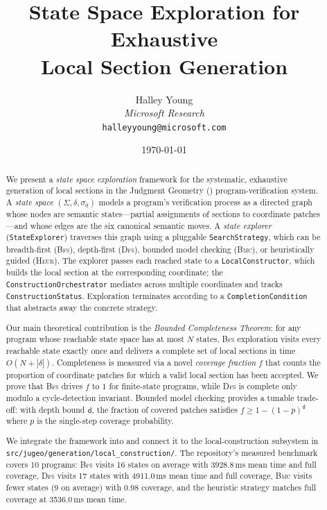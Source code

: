 \documentclass[11pt]{article}
\title{\textbf{State Space Exploration for Exhaustive\\Local Section Generation}}
\author{%
  Halley Young\\
  \textit{Microsoft Research}\\
  \texttt{halleyyoung@microsoft.com}
}
\date{\today}
\newcommand{\St}{\Sigma}                      %
\newcommand{\state}{\sigma}                   %
\newcommand{\Trans}{\delta}                   %
\newcommand{\BFS}{\textsc{Bfs}}
\newcommand{\DFS}{\textsc{Dfs}}
\newcommand{\BMC}{\textsc{Bmc}}
\newcommand{\HEUR}{\textsc{Heur}}
\newcommand{\depth}{\mathsf{d}}               %
\newcommand{\covfrac}{f}                      %
\begin{document}
\maketitle

\begin{abstract}
We present a \emph{state space exploration} framework for the
systematic, exhaustive generation of local sections in the Judgment
Geometry (\JuGeo{}) program-verification system.  A \emph{state space}
$(\St, \Trans, \state_0)$ models a program's verification process as a
directed graph whose nodes are semantic states---partial assignments of
sections to coordinate patches---and whose edges are the six canonical
semantic moves.  A \emph{state explorer} (\texttt{StateExplorer})
traverses this graph using a pluggable \texttt{SearchStrategy}, which
can be breadth-first (\BFS), depth-first (\DFS), bounded model checking
(\BMC), or heuristically guided (\HEUR).  The explorer passes each
reached state to a \texttt{LocalConstructor}, which builds the local
section at the corresponding coordinate; the \texttt{ConstructionOrchestrator}
mediates across multiple coordinates and tracks \texttt{ConstructionStatus}.
Exploration terminates according to a \texttt{CompletionCondition} that
abstracts away the concrete strategy.

Our main theoretical contribution is the \emph{Bounded Completeness
Theorem}: for any program whose reachable state space has at most $N$
states, \BFS{} exploration visits every reachable state exactly once
and delivers a complete set of local sections in time $O(N + |\Trans|)$.
Completeness is measured via a novel \emph{coverage fraction} $\covfrac$
that counts the proportion of coordinate patches for which a valid local
section has been accepted.  We prove that \BFS{} drives $\covfrac$ to
$1$ for finite-state programs, while \DFS{} is complete only modulo a
cycle-detection invariant.  Bounded model checking provides a tunable
trade-off: with depth bound $\depth$, the fraction of covered patches
satisfies $\covfrac \ge 1 - (1 - p)^{\depth}$ where $p$ is the
single-step coverage probability.

We integrate the framework into \JuGeo{} and connect it to the
local-construction subsystem in
\texttt{src/jugeo/generation/local\_construction/}.  The repository's
measured benchmark covers 10 programs: \BFS{} visits 16 states on
average with 3928.8\,ms mean time and full coverage, \DFS{} visits 17
states with 4911.0\,ms mean time and full coverage, \BMC{} visits fewer
states (9 on average) with 0.98 coverage, and the heuristic strategy
matches full coverage at 3536.0\,ms mean time.
\end{abstract}
\end{document}

